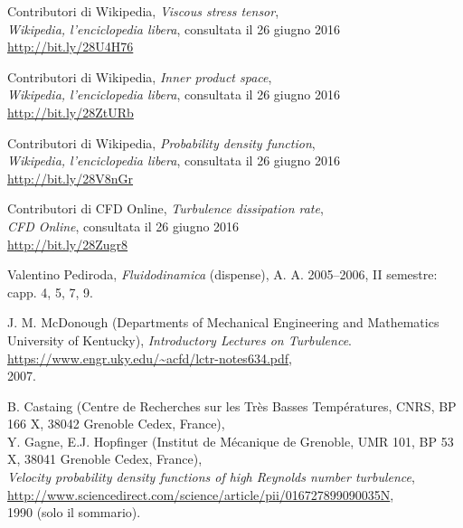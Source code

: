 \documentclass[12pt,a4paper]{article}
\numberwithin{equation}{section}
\begin{document}
\begin{thebibliography}{11}
  
  Contributori di Wikipedia, \emph{Viscous stress tensor},\\
  \emph{Wikipedia, l'enciclopedia libera}, consultata il 26 giugno 2016 \\
  \url{http://bit.ly/28U4H76}

  Contributori di Wikipedia, \emph{Inner product space},\\
  \emph{Wikipedia, l'enciclopedia libera}, consultata il 26 giugno 2016 \\
  \url{http://bit.ly/28ZtURb}

   Contributori di Wikipedia, \emph{Probability density function},\\
  \emph{Wikipedia, l'enciclopedia libera}, consultata il 26 giugno 2016 \\
  \url{http://bit.ly/28V8nGr}
   
   Contributori di CFD Online, \emph{Turbulence dissipation rate},\\
  \emph{CFD Online}, consultata il 26 giugno 2016 \\
  \url{http://bit.ly/28Zugr8}    

  Valentino Pediroda, 
  \emph{Fluidodinamica} (dispense), A. A. 2005--2006, II semestre: capp. 4, 5, 7, 9.
  
  J. M. McDonough (Departments of Mechanical Engineering and Mathematics
University of Kentucky), \emph{Introductory Lectures on Turbulence}. \\
  \url{https://www.engr.uky.edu/~acfd/lctr-notes634.pdf},  \\
  2007.
  
  B. Castaing (Centre de Recherches sur les Très Basses Températures, CNRS, BP 166 X, 38042 Grenoble Cedex, France), \\
  Y. Gagne, E.J. Hopfinger (Institut de Mécanique de Grenoble, UMR 101, BP 53 X, 38041 Grenoble Cedex, France), \\
  \emph{Velocity probability density functions of high Reynolds number turbulence}, \\
  \url{http://www.sciencedirect.com/science/article/pii/016727899090035N}, \\
  1990 (solo il sommario).
  

\end{thebibliography}
\end{document}
